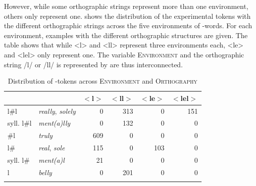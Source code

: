  However, while some orthographic strings represent more than one environment, others only represent one. 
 shows the distribution of the experimental tokens with the different orthographic strings across the five environments of -words. For each environment, examples with the different orthographic structures are given.
The table shows that while <l> and  <ll>  represent three environments each,  <le> and <lel> only represent one. 
The variable \textsc{Environment} and the orthographic string /l/ or /ll/ is represented by are thus interconnected. 


\begin{table}
	\caption{Distribution of -tokens across \textsc{Environment} and \textsc{Orthography}}
	\label{tab: ly dazta ortho and environment}
	
	
		\begin{tabular}{llrrrr}
				\lsptoprule
			&      & $<$l$>$  & $<$ll$>$ & $<$le$>$ & $<$lel$>$ \\
			
			\midrule
			
			
			
			l\#l  &\color{lsMidBlue}\textit{really}, \color{lsMidBlue}\textit{solely}   
			&       0 &     313  &   0&    151\\
			
			syll. l\#l &\color{lsMidBlue}\textit{ment(a)lly}   &   0 &     132    &   0 &   0\\
			
			\#l   &\color{lsMidBlue}\textit{truly} &        609   &   0    &   0  &    0\\
			
			l\#   &\color{lsMidBlue}\textit{real}, \color{lsMidBlue}\textit{sole} &        115&   0  &         103& 0\\
			
			syll. l\#&\color{lsMidBlue}\textit{ment(a)l} &         21&   0  &    0 &     0\\
			
			l        &\color{lsMidBlue}\textit{belly}  &    0 &    201    &   0 &   0\\
			\lspbottomrule                                                                                
		\end{tabular}
	
\end{table}

